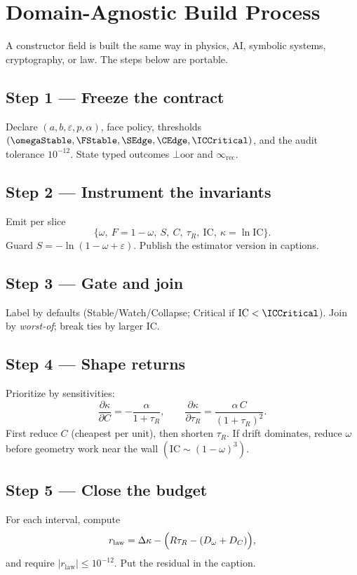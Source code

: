\section{Domain-Agnostic Build Process}
\label{sec:process}
A constructor field is built the same way in physics, AI, symbolic systems, cryptography, or law. The steps below are portable.

\subsection*{Step 1 — Freeze the contract}
Declare \((a,b,\varepsilon,p,\alpha)\), face policy, thresholds \((\omegaStable,\FStable,\SEdge,\CEdge,\ICCritical)\), and the audit tolerance \(10^{-12}\).
State typed outcomes \(\bot\!\mathrm{oor}\) and \(\infty_{\mathrm{rec}}\).

\subsection*{Step 2 — Instrument the invariants}
Emit per slice
\[
\{\omega,\ F{=}1-\omega,\ S,\ C,\ \tau_{R},\ \mathrm{IC},\ \kappa{=}\ln\mathrm{IC}\}.
\]
Guard \(S=-\ln(1-\omega+\varepsilon)\). Publish the estimator version in captions.

\subsection*{Step 3 — Gate and join}
Label by defaults (Stable/Watch/Collapse; Critical if \(\mathrm{IC}<\ICCritical\)). Join by \emph{worst-of}; break ties by larger \(\mathrm{IC}\).

\subsection*{Step 4 — Shape returns}
Prioritize by sensitivities:
\[
\frac{\partial \kappa}{\partial C}=-\frac{\alpha}{1+\tau_{R}},\qquad
\frac{\partial \kappa}{\partial \tau_{R}}= \frac{\alpha\,C}{(1+\tau_{R})^2}.
\]
First reduce \(C\) (cheapest per unit), then shorten \(\tau_{R}\).
If drift dominates, reduce \(\omega\) before geometry work near the wall \((\mathrm{IC}\sim(1-\omega)^3)\).

\subsection*{Step 5 — Close the budget}
For each interval, compute
\[
r_{\text{law}} = \Delta\kappa - \Bigl(R\tau_{R} - (D_{\omega}+D_{C})\Bigr),
\]
and require \(|r_{\text{law}}|\le 10^{-12}\). Put the residual in the caption.

